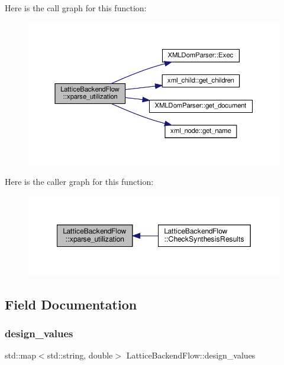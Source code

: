 Here is the call graph for this function\+:
\nopagebreak
\begin{figure}[H]
\begin{center}
\leavevmode
\includegraphics[width=350pt]{de/dd0/classLatticeBackendFlow_af95e74925a7a7c8f6e770fa99f62481b_cgraph}
\end{center}
\end{figure}
Here is the caller graph for this function\+:
\nopagebreak
\begin{figure}[H]
\begin{center}
\leavevmode
\includegraphics[width=349pt]{de/dd0/classLatticeBackendFlow_af95e74925a7a7c8f6e770fa99f62481b_icgraph}
\end{center}
\end{figure}


\subsection{Field Documentation}
\mbox{\label{classLatticeBackendFlow_a2980298887193f63d6b1aa0ab64db340}} 
\subsubsection{\texorpdfstring{design\+\_\+values}{design\_values}}
{\footnotesize\ttfamily std\+::map$<$std\+::string, double$>$ Lattice\+Backend\+Flow\+::design\+\_\+values\hspace{0.3cm}{\ttfamily [private]}}



